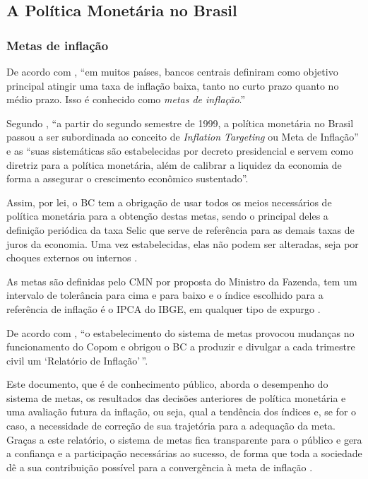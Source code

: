 \documentclass[
	10pt,				%
	openright,			%
	twoside,			%
	a5paper,			%
	english,			%
	french,				%
	spanish,			%
	brazil				%
	]{abntex2}
\renewenvironment{quote}
  {\small\list{}{\rightmargin=0.1cm \leftmargin=4cm}%
   \item\relax}
  {\endlist}
\begin{document}
\subsection{A Política Monetária no Brasil}\label{subsec:pol_mon_br}

\subsubsection{Metas de inflação}\label{metas-de-inflauxe7uxe3o}

De acordo com , ``em muitos países, bancos
centrais definiram como objetivo principal atingir uma taxa de inflação
baixa, tanto no curto prazo quanto no médio prazo. Isso é conhecido como
\emph{metas de inflação}.''

Segundo , ``a partir do segundo semestre
de 1999, a política monetária no Brasil passou a ser subordinada ao
conceito de \emph{Inflation Targeting} ou Meta de Inflação'' e as ``suas
sistemáticas são estabelecidas por decreto presidencial e servem como
diretriz para a política monetária, além de calibrar a liquidez da
economia de forma a assegurar o crescimento econômico sustentado''.

\begin{quote}
Assim, por lei, o BC tem a obrigação de usar todos os meios necessários
de política monetária para a obtenção destas metas, sendo o principal
deles a definição periódica da taxa Selic que serve de referência para
as demais taxas de juros da economia. Uma vez estabelecidas, elas não
podem ser alteradas, seja por choques externos ou internos
\cite[p.~60]{fortuna2015}.
\end{quote}

As metas são definidas pelo CMN por proposta do Ministro da Fazenda, tem
um intervalo de tolerância para cima e para baixo e o índice escolhido
para a referência de inflação é o IPCA do IBGE, em qualquer tipo de
expurgo \cite[p.~60]{fortuna2015}.

De acordo com , ``o estabelecimento do
sistema de metas provocou mudanças no funcionamento do Copom e obrigou o
BC a produzir e divulgar a cada trimestre civil um `Relatório de
Inflação'\,''.

\begin{quote}
Este documento, que é de conhecimento público, aborda o desempenho do
sistema de metas, os resultados das decisões anteriores de política
monetária e uma avaliação futura da inflação, ou seja, qual a tendência
dos índices e, se for o caso, a necessidade de correção de sua
trajetória para a adequação da meta. Graças a este relatório, o sistema
de metas fica transparente para o público e gera a confiança e a
participação necessárias ao sucesso, de forma que toda a sociedade dê a
sua contribuição possível para a convergência à meta de inflação
\cite[p.60-61]{fortuna2015}.
\end{quote}
\end{document}
